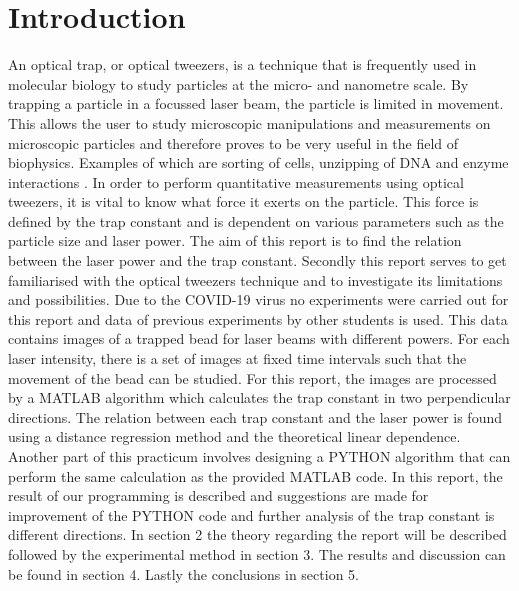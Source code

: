 \section{Introduction}

An optical trap, or optical tweezers, is a technique that is frequently used in molecular biology to study particles at the micro- and nanometre scale. By trapping a particle in a focussed laser beam, the particle is limited in movement. This allows the user to study microscopic manipulations and measurements on microscopic particles and therefore proves to be very useful in the field of biophysics. Examples of which are sorting of cells, unzipping of DNA and enzyme interactions \cite{MIT}\cite{Velthuis}.
In order to perform quantitative measurements using optical tweezers, it is vital to know what force it exerts on the particle. This force is defined by the trap constant and is dependent on various parameters such as the particle size and laser power.
The aim of this report is to find the relation between the laser power and the trap constant. Secondly this report serves to get familiarised with the optical tweezers technique and to investigate its limitations and possibilities.
Due to the COVID-19 virus no experiments were carried out for this report and data of previous experiments by other students is used. This data contains images of a trapped bead for laser beams with different powers. For each laser intensity, there is a set of images at fixed time intervals such that the movement of the bead can be studied. For this report, the images are processed by a MATLAB algorithm which calculates the trap constant in two perpendicular directions. The relation between each trap constant and the laser power is found using a distance regression method and the theoretical linear dependence. Another part of this practicum involves designing a PYTHON algorithm that can perform the same calculation as the provided MATLAB code. In this report, the result of our programming is described and suggestions are made for improvement of the PYTHON code and further analysis of the trap constant is different directions.
In section 2 the theory regarding the report will be described followed by the experimental method in section 3. The results and discussion can be found in section 4. Lastly the conclusions in section 5.









